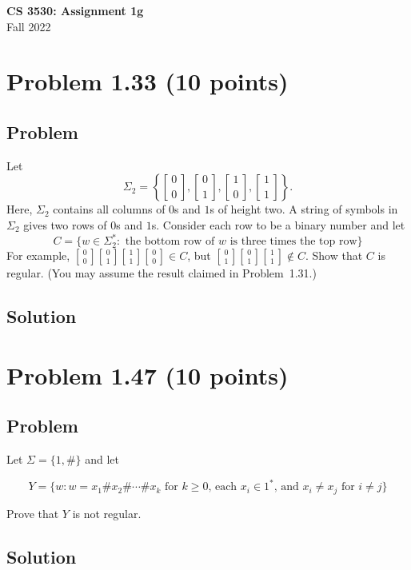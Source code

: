 \documentclass{article}
\begin{document}
\begin{empfile}

\begin{center}
\textbf{\Large CS 3530: Assignment 1g} \\[2mm]
Fall 2022
\end{center}

\raggedright

\section*{Problem 1.33 (10 points)}

\subsection*{Problem}

\newcommand{\col}[2]{\genfrac{[}{]}{0pt}{}{\,#1\,}{\,#2\,}}
Let
$$ \Sigma_2=\left\{\col{0}{0},\col{0}{1},\col{1}{0},\col{1}{1}\right\}. $$
Here, $\Sigma_2$ contains all columns of $0$s and $1$s of height
two. A string of symbols in $\Sigma_2$ gives two rows of $0$s and
$1$s. Consider each row to be a binary number and let
$$ C=\{w\in\Sigma_2^*:\text{ the bottom row of }w\text{ is three times the top row}\}$$
For example, $\col{0}{0}\col{0}{1}\col{1}{1}\col{0}{0}\in C$, but
$\col{0}{1}\col{0}{1}\col{1}{1}\notin C$. Show that $C$ is regular.
(You may assume the result claimed in Problem~1.31.)

\subsection*{Solution}

%
%
%
%

\section*{Problem 1.47 (10 points)}

\subsection*{Problem}

Let $\Sigma=\{1,\#\}$ and let

$$ Y=\{w:w=x_1\#x_2\#\cdots\#x_k\text{ for }k\geq0\text{, each }x_i\in1^*\text{, and }x_i\neq x_j\text{ for }i\neq j\} $$

Prove that $Y$ is not regular.

\subsection*{Solution}

\end{empfile}
\immediate{}
\end{document}
